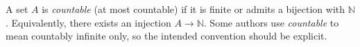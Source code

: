 
A set $A$ is \emph{countable} (at most countable) if it is finite or admits a bijection with $\mathbb N$. Equivalently, there exists an injection $A\to\mathbb N$. Some authors use \emph{countable} to mean countably infinite only, so the intended convention should be explicit.
